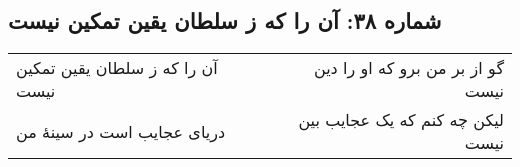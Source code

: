 \begin{center}
\section*{شماره ۳۸: آن را که ز سلطان یقین تمکین نیست}
\label{sec:038}
\begin{longtable}{l p{0.5cm} r}
آن را که ز سلطان یقین تمکین نیست
&&
گو از بر من برو که او را دین نیست
\\
دریای عجایب است در سینهٔ من
&&
لیکن چه کنم که یک عجایب بین نیست
\\
\end{longtable}
\end{center}

